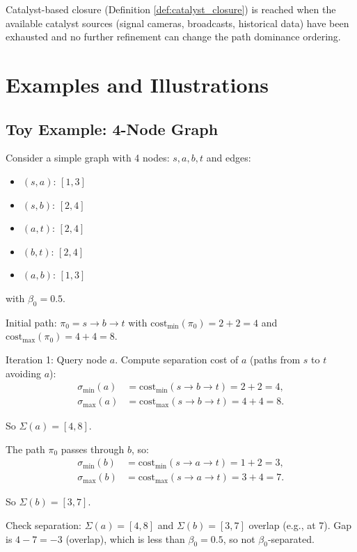 \documentclass[twocolumn,11pt,a4paper]{article}
\theoremstyle{definition}
\begin{document}
Catalyst-based closure (Definition \ref{def:catalyst_closure}) is reached when the available catalyst sources (signal cameras, broadcasts, historical data) have been exhausted and no further refinement can change the path dominance ordering.

\section{Examples and Illustrations}

\subsection{Toy Example: 4-Node Graph}

Consider a simple graph with 4 nodes: $s, a, b, t$ and edges:
\begin{itemize}
\item $(s, a)$: $[1, 3]$
\item $(s, b)$: $[2, 4]$
\item $(a, t)$: $[2, 4]$
\item $(b, t)$: $[2, 4]$
\item $(a, b)$: $[1, 3]$
\end{itemize}

with $\beta_0 = 0.5$.

Initial path: $\pi_0 = s \to b \to t$ with $\text{cost}_{\min}(\pi_0) = 2 + 2 = 4$ and $\text{cost}_{\max}(\pi_0) = 4 + 4 = 8$.

Iteration 1: Query node $a$. Compute separation cost of $a$ (paths from $s$ to $t$ avoiding $a$):
\begin{align}
\sigma_{\min}(a) &= \text{cost}_{\min}(s \to b \to t) = 2 + 2 = 4, \\
\sigma_{\max}(a) &= \text{cost}_{\max}(s \to b \to t) = 4 + 4 = 8.
\end{align}

So $\Sigma(a) = [4, 8]$.

The path $\pi_0$ passes through $b$, so:
\begin{align}
\sigma_{\min}(b) &= \text{cost}_{\min}(s \to a \to t) = 1 + 2 = 3, \\
\sigma_{\max}(b) &= \text{cost}_{\max}(s \to a \to t) = 3 + 4 = 7.
\end{align}

So $\Sigma(b) = [3, 7]$.

Check separation: $\Sigma(a) = [4, 8]$ and $\Sigma(b) = [3, 7]$ overlap (e.g., at 7). Gap is $4 - 7 = -3$ (overlap), which is less than $\beta_0 = 0.5$, so not $\beta_0$-separated.
\end{document}

